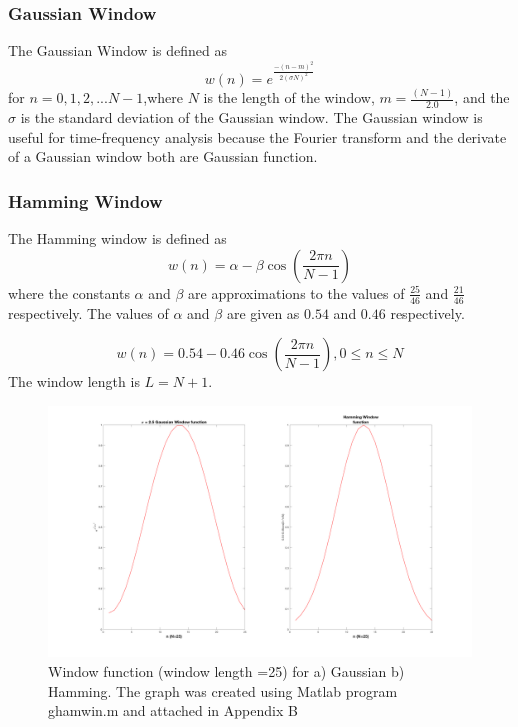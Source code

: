 \subsubsection{Gaussian Window}
The Gaussian Window is defined as 
\begin{equation}
w(n) = e^\frac{-(n-m)^2}{2(\sigma N)^2}
\end{equation}
for $n = 0,1,2,... N-1$,where $N$ is the length of the window, $m=\frac{(N-1)}{2.0}$, and the $\sigma$ is the standard deviation of the Gaussian window. The Gaussian window is useful for time-frequency analysis because the Fourier transform and the derivate of a Gaussian window both are Gaussian function.

\subsubsection{Hamming Window}
The Hamming window is defined as 
 \begin{equation}
w(n) = \alpha - \beta \cos(\frac{2\pi n}{N - 1})
\end{equation}
where the constants $\alpha$ and $\beta$ are approximations to the values of $\frac{25}{46}$ and $\frac{21}{46}$ respectively. The values of $\alpha$ and $\beta$ are given as $0.54$ and $0.46$ respectively. 

 \begin{equation}
w(n) = 0.54 - 0.46 \cos(\frac{2\pi n}{N - 1}), 0 \le n \le N
\end{equation}
The window length is $L = N + 1$.

\begin{figure}[!ht]
\includegraphics[scale=.15]{Images/GWinHWin}
\caption{Window function (window length  =25) for a) Gaussian b) Hamming. The graph was created using Matlab program ghamwin.m and attached in Appendix B }
\label{fig:ghamwin}
\end{figure}

